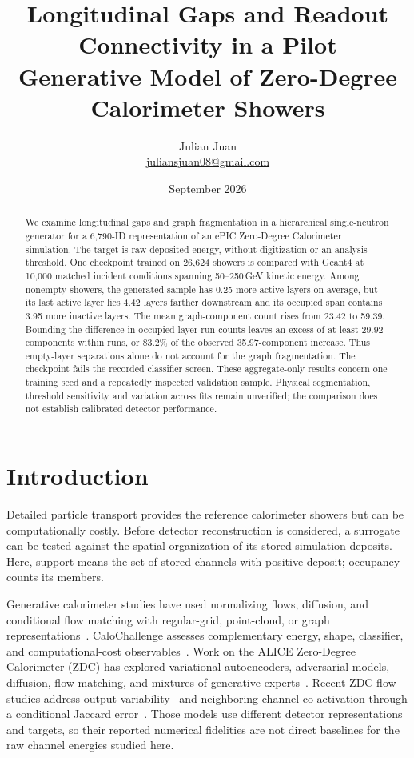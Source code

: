 \documentclass[11pt]{article}
\title{Longitudinal Gaps and Readout Connectivity in a Pilot\\Generative Model of Zero-Degree Calorimeter Showers}
\author{Julian Juan\\[3pt]\small\href{mailto:juliansjuan08@gmail.com}{juliansjuan08@gmail.com}}
\date{September 2026}
\begin{document}
\maketitle

\begin{abstract}
We examine longitudinal gaps and graph fragmentation in a hierarchical single-neutron generator for a 6,790-ID representation of an ePIC Zero-Degree Calorimeter simulation. The target is raw deposited energy, without digitization or an analysis threshold. One checkpoint trained on 26,624 showers is compared with Geant4 at 10,000 matched incident conditions spanning 50--250\,GeV kinetic energy. Among nonempty showers, the generated sample has 0.25 more active layers on average, but its last active layer lies 4.42 layers farther downstream and its occupied span contains 3.95 more inactive layers. The mean graph-component count rises from 23.42 to 59.39. Bounding the difference in occupied-layer run counts leaves an excess of at least 29.92 components within runs, or 83.2\% of the observed 35.97-component increase. Thus empty-layer separations alone do not account for the graph fragmentation. The checkpoint fails the recorded classifier screen. These aggregate-only results concern one training seed and a repeatedly inspected validation sample. Physical segmentation, threshold sensitivity and variation across fits remain unverified; the comparison does not establish calibrated detector performance.
\end{abstract}

\section{Introduction}

Detailed particle transport provides the reference calorimeter showers but can be computationally costly. Before detector reconstruction is considered, a surrogate can be tested against the spatial organization of its stored simulation deposits. Here, support means the set of stored channels with positive deposit; occupancy counts its members.

Generative calorimeter studies have used normalizing flows, diffusion, and conditional flow matching with regular-grid, point-cloud, or graph representations~\cite{caloflow,calodiffusion,calograph,caloclouds2,calodream}. CaloChallenge assesses complementary energy, shape, classifier, and computational-cost observables~\cite{calochallenge,kansalmetrics}. Work on the ALICE Zero-Degree Calorimeter (ZDC) has explored variational autoencoders, adversarial models, diffusion, flow matching, and mixtures of generative experts~\cite{dubinskizdc,kitazdc,fasterzdc,expertsim,wojnar2025}. Recent ZDC flow studies address output variability~\cite{majerziaf} and neighboring-channel co-activation through a conditional Jaccard error~\cite{majerz2026}. Those models use different detector representations and targets, so their reported numerical fidelities are not direct baselines for the raw channel energies studied here.
\end{document}
